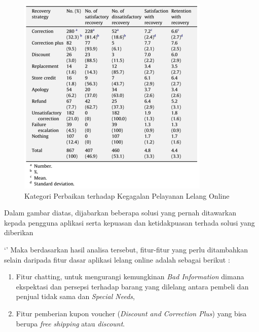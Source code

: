 	  \begin{figure}[H]
        \centering
        \includegraphics[width=\linewidth]{images/bab3/Solusi-Perbaikan-Ketidakpuasan.png}
        \caption{Kategori Perbaikan terhadap Kegagalan Pelayanan Lelang Online}
        \label{service-recovery-strategies}
      \end{figure}
      
      Dalam gambar diatas, dijabarkan beberapa solusi yang pernah ditawarkan kepada pengguna aplikasi serta kepuasan dan ketidakpuasan terhada solusi yang diberikan
      
      
`'      Maka berdasarkan hasil analisa tersebut, fitur-fitur yang perlu ditambahkan selain daripada fitur dasar aplikasi lelang online adalah sebagai berikut :
      \begin{enumerate}
      \item Fitur chatting, untuk mengurangi kemungkinan \textit{Bad Information} dimana ekspektasi dan persepsi terhadap barang yang dilelang antara pembeli dan penjual tidak sama dan \textit{Special Needs}, 
      \item Fitur pemberian kupon voucher (\textit{Discount and Correction Plus}) yang bisa berupa \textit{free shipping} atau \textit{discount}.
      \end{enumerate}
  
